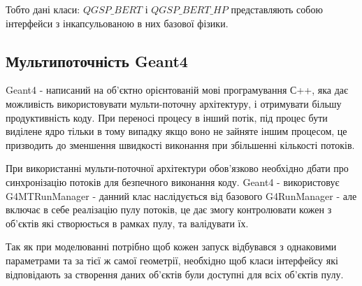 \documentclass[a4paper, 14pt]{article}
\numberwithin{equation}{section}
\numberwithin{table}{section}
\begin{document}
	Тобто дані класи: $QGSP\_BERT$ і $QGSP\_BERT\_HP$ представляють собою інтерфейси з інкапсульованою в них базової фізики.
	
	\subsection{Мультипоточність Geant4}
	Geant4 - написаний на об'єктно орієнтованій мові програмування С++, яка дає можливість використовувати мульти-поточну архітектуру, і отримувати більшу продуктивність коду. При переносі процесу в інший потік, під процес бути виділене ядро тільки в тому випадку якщо воно не зайняте іншим процесом, це призводить до зменшення швидкості виконання при збільшенні кількості потоків.
	
	При використанні мульти-поточної архітектури обов'язково необхідно дбати про синхронізацію потоків для безпечного виконання коду. Geant4 - використовує G4MTRunManager - данний клас наслідується від базового G4RunManager - але включає в себе реалізацію пулу потоків, це дає змогу контролювати кожен з об'єктів які створюється в рамках пулу, та валідувати їх. 
	
	Так як при моделюванні потрібно щоб кожен запуск відбувався з однаковими параметрами та за тієї ж самої геометрії, необхідно щоб класи інтерфейсу які відповідають за створення даних об'єктів були доступні для всіх об'єктів пулу.
	
\end{document}
